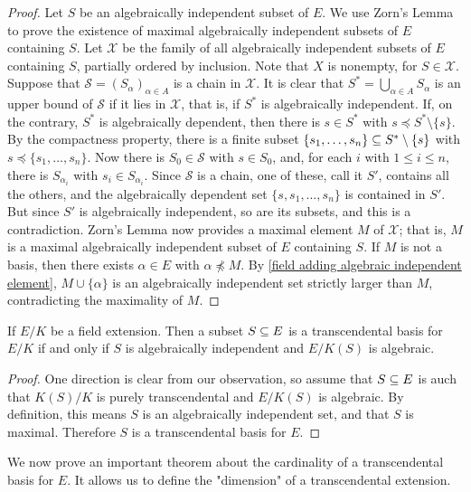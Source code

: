 \begin{proof}
Let $S$ be an algebraically independent subset of $E$. We use Zorn's Lemma to prove the existence of maximal algebraically independent subsets of $E$ containing $S$. Let $\mathcal{X}$ be the family of all algebraically independent subsets of $E$ containing $S$, partially ordered by inclusion. Note that $X$ is nonempty, for $S\in\mathcal{X}$. Suppose that $\mathcal{S}=(S_\alpha)_{\alpha\in A}$ is a chain in $\mathcal{X}$. It is clear that $S^*=\bigcup_{\alpha\in A}S_\alpha$ is an upper bound of $\mathcal{S}$ if it lies in $\mathcal{X}$, that is, if $S^*$ is algebraically independent. If, on the contrary, $S^*$ is algebraically dependent, then there is $s\in S^*$ with $s\preceq S^*\setminus\{s\}$. By the compactness property, there is a finite subset $\{s_1,\dots,s_n\}\subseteq S^*\setminus\{s\}$ with $s\preceq\{s_1,\dots,s_n\}$. Now there is $S_0\in\mathcal{S}$ with $s\in S_0$, and, for each $i$ with $1\leq i\leq n$, there is $S_{\alpha_i}$ with $s_i\in S_{\alpha_i}$. Since $\mathcal{S}$ is a chain, one of these, call it $S'$, contains all the others, and the algebraically dependent set $\{s,s_1,\dots,s_n\}$ is contained in $S'$. But since $S'$ is algebraically independent, so are its subsets, and this is a contradiction. Zorn's Lemma now provides a maximal element $M$ of $\mathcal{X}$; that is, $M$ is a maximal algebraically independent subset of $E$ containing $S$. If $M$ is not a basis, then there exists $\alpha\in E$ with $\alpha\not\preceq M$. By \cref{field adding algebraic independent element}, $M\cup\{\alpha\}$ is an algebraically independent set strictly larger than $M$, contradicting the maximality of $M$.
\end{proof}
\begin{theorem}\label{field ext transcendental basis iff}
If $E/K$ be a field extension. Then a subset $S\subseteq E$ is a transcendental basis for $E/K$ if and only if $S$ is algebraically independent and $E/K(S)$ is algebraic.
\end{theorem}
\begin{proof}
One direction is clear from our observation, so assume that $S\subseteq E$ is auch that $K(S)/K$ is purely transcendental and $E/K(S)$ is algebraic. By definition, this means $S$ is an algebraically independent set, and that $S$ is maximal. Therefore $S$ is a transcendental basis for $E$.
\end{proof}
We now prove an important theorem about the cardinality of a transcendental basis for $E$. It allows us to define the "dimension" of a transcendental extension.
